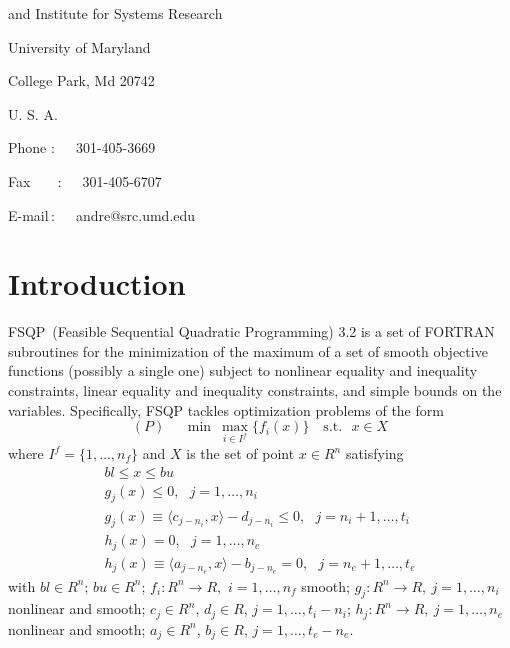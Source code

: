 \begin{titlepage}
\hspace{5em}and Institute for Systems Research

\hspace{5em}University of Maryland

\hspace{5em}College Park, Md 20742

\hspace{5em}U. S. A.

\smallskip
\hspace{5em}Phone$\,\,$:~~~301-405-3669

\hspace{5em}Fax~~~$\,\;$:~~~301-405-6707

\hspace{5em}E-mail$\,$:~~~andre@src.umd.edu
\end{titlepage}

\tableofcontents

\newpage
\section{Introduction}
\label{intro}
FSQP~(Feasible Sequential Quadratic Programming) 3.2
is a set of FORTRAN subroutines
for the minimization of the maximum of a set of smooth 
objective functions (possibly a single one) subject to 
nonlinear equality and inequality constraints, 
linear equality and inequality constraints, 
and simple bounds on the variables. Specifically, FSQP
tackles optimization problems of the form
\smallskip
$$
  (P)~~~~~~ \min ~ \max\limits_{i\in I^f} \{f_i(x)\} 
                             \mbox{~~~s.t.~~}x\in X
$$
where $I^f=\{1,\ldots,n_f\}$ and $X$ is the set of point $x\in R^n$ 
satisfying
$$\begin{array}{l}
      bl \leq x \leq bu  \\
      g_j(x) \leq 0,~~~j=1,\ldots,n_i\\
      g_j(x)\equiv \langle c_{j-n_i},x\rangle - d_{j-n_i} \leq 0, 
      ~~~j=n_i+1,\ldots,t_i \\
      h_j(x)=0,~~~j=1,\ldots,n_e\\
      h_j(x)\equiv\langle a_{j-n_e},x \rangle-b_{j-n_e}=0, ~~~j=n_e+1,\ldots,t_
e
\end{array}$$
with $bl\in R^n$; $bu\in R^n$; 
$f_i:R^n\rightarrow R,$ $i=1,\ldots,n_f$ smooth;
$g_j:R^n\rightarrow R,~j=1,\ldots,n_i$ nonlinear and smooth;
$c_j\in R^n$, $d_j\in R$, $j=1,\ldots,t_i-n_i$;
$h_j:R^n\rightarrow R,~j=1,\ldots,n_e$ nonlinear and smooth;
$a_j\in R^n$, $b_j\in R$, $j=1,\ldots,t_e-n_e$. 

